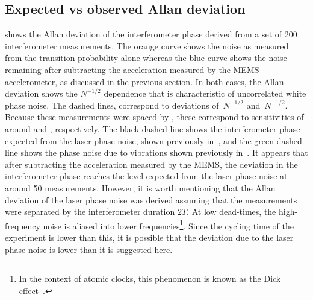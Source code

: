 \subsection{Expected vs observed Allan deviation}\label{subsec:stability}	
 shows the Allan deviation of the
interferometer phase derived from a set of 200 interferometer
measurements. The orange
curve shows the noise as measured from the transition probability
alone whereas the blue curve shows the noise remaining after
subtracting the acceleration measured by the MEMS accelerometer, as
discussed in the previous section. In both
cases, the Allan deviation shows the $N^{-1/2}$ dependence that is
characteristic of uncorrelated white phase noise. The dashed
lines, correspond to deviations of
\,$N^{-1/2}$ and \,$N^{-1/2}$.
Because these measurements were spaced by , these
correspond to sensitivities of around
 and
,
respectively. The black dashed line shows the interferometer phase
expected from the laser phase noise, shown previously
in~, and the green dashed line shows the
phase noise due to vibrations shown previously
in~. It appears that after subtracting the
acceleration measured by the MEMS, the deviation in the interferometer
phase reaches the level expected from the laser phase noise at around
50 measurements. However, it is worth mentioning that the Allan
deviation of the laser phase noise was derived assuming that the
measurements were separated by the interferometer duration $2T$. At
low dead-times, the high-frequency noise is aliased into lower
frequencies\footnote{In the context of atomic clocks, this phenomenon
is known as the Dick effect~\cite{Dick1990}.}. Since
the cycling time of the experiment is lower than this, it is possible
that the deviation due to the laser phase noise is lower than it is
suggested here.
